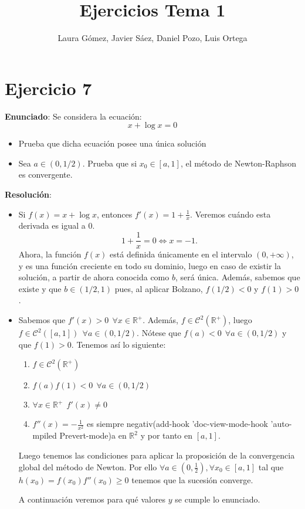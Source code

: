 \documentclass[11pt]{article}
\title{\textbf{Ejercicios Tema 1}}
\author{Laura Gómez, Javier Sáez, Daniel Pozo, Luis Ortega}
\begin{document}
\maketitle
\section{Ejercicio 7}
\textbf{Enunciado}: Se considera la ecuación:
\[
x + \log x = 0
\]
\begin{itemize}
	\item Prueba que dicha ecuación posee una única solución
	\item Sea $a \in (0, 1/2)$. Prueba que si $x_0 \in [a,1]$, el método de Newton-Raphson es convergente.
\end{itemize}
\textbf{Resolución}:\\
\begin{itemize}
	\item Si $f(x) = x + \log x$, entonces $f'(x) = 1 + \frac{1}{x}$. Veremos cuándo esta derivada es igual a 0.
	\[
	1+\frac{1}{x} = 0 \iff x = -1.
	\]
	Ahora, la función $f(x)$ está definida únicamente en el intervalo $(0,+\infty)$, y es una función creciente en todo su dominio, luego en caso de existir la solución, a partir de ahora conocida como $b$, será única. Además, sabemos que existe y que $b\in(1/2,1)$ pues, al aplicar Bolzano, $f(1/2) < 0$ y $f(1) > 0$.
	
	\item Sabemos que $f'(x)>0 \ \ \forall x \in \mathbb{R}^+$. Además, $f\in \mathcal{C}^2(\mathbb{R}^+)$, luego $f\in \mathcal{C}^2([a,1]) \ \ \forall a \in (0,1/2)$. Nótese que $f(a) < 0 \ \ \forall a \in (0,1/2)$ y que $f(1) > 0$. Tenemos así lo siguiente:
	\begin{enumerate}
	\item $f \in \mathcal C ^2 (\mathbb R ^+)$
	\item $f(a)f(1) < 0 \ \  \forall a \in (0,1/2)$
	\item $\forall x \in \mathbb R ^+ \ \ f'(x) \ne 0$
	\item $f''(x)= -\frac{1}{x^2}$ es siempre negativ(add-hook 'doc-view-mode-hook 'auto-mpiled Prevert-mode)a en $\mathbb R ^2$ y por tanto en $[a,1]$.
\end{enumerate}
Luego tenemos las condiciones para aplicar la proposición de la convergencia global del método de Newton. Por ello $\forall a \in (0,\frac{1}{2}), \forall x_0 \in [a,1]$ tal que $h(x_0)=f(x_0)f''(x_0)\geq0$ tenemos que la sucesión converge.

A continuación veremos para qué valores $y$ se cumple lo enunciado.


\end{itemize}
\end{document}

